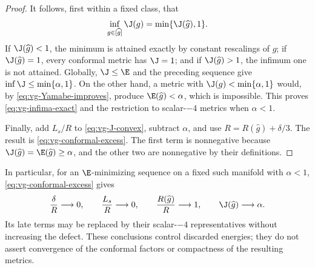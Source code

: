 \begin{proof}
It follows, first within a fixed class, that
\begin{equation}\label{eq:vg-class-infimum}
 \inf_{g\in[\widehat g]}\J(g)=\min\{\J(\widehat g),1\}.
\end{equation}
If $\J(\widehat g)<1$, the minimum is attained exactly by constant
rescalings of $\widehat g$; if $\J(\widehat g)=1$, every conformal metric
has $\J=1$; and if $\J(\widehat g)>1$, the infimum one is not attained.
Globally, $\J\leq\E$ and the preceding sequence give
$\inf\J\leq\min\{\alpha,1\}$.  On the other hand, a metric with
$\J(g)<\min\{\alpha,1\}$ would, by
\eqref{eq:vg-Yamabe-improves}, produce
$\E(\widehat g)<\alpha$, which is impossible.  This proves
\eqref{eq:vg-infima-exact} and the restriction to scalar-$-4$ metrics
when $\alpha<1$.

Finally, add $L_s/R$ to \eqref{eq:vg-J-convex}, subtract $\alpha$, and
use $R=R(\widehat g)+\delta/3$.  The result is
\eqref{eq:vg-conformal-excess}.  The first term is nonnegative because
$\J(\widehat g)=\E(\widehat g)\geq\alpha$, and the other two are
nonnegative by their definitions.
\end{proof}

In particular, for an $\E$-minimizing sequence on a fixed such manifold
with $\alpha<1$, \eqref{eq:vg-conformal-excess} gives
\[
 \frac{\delta}{R}\longrightarrow0,\qquad
 \frac{L_s}{R}\longrightarrow0,\qquad
 \frac{R(\widehat g)}R\longrightarrow1,
 \qquad \J(\widehat g)\longrightarrow\alpha.
\]
Its late terms may be replaced by their scalar-$-4$ representatives
without increasing the defect.  These conclusions control discarded
energies; they do not assert convergence of the conformal factors or
compactness of the resulting metrics.

